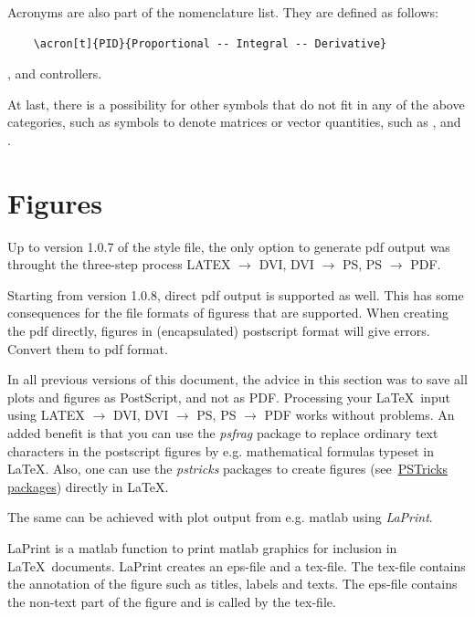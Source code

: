             Acronyms are also part of the nomenclature list. They are defined as follows:
            \begin{verbatim}
    \acron[t]{PID}{Proportional -- Integral -- Derivative}
            \end{verbatim}
            , 
             and
             controllers.
            
            At last, there is a possibility for other symbols that do not fit in any of the above categories, such as symbols to denote matrices or vector quantities, such as ,  and .
    \section{Figures}
        Up to version 1.0.7 of the style file, the only option to generate pdf output was throught the three-step process LATEX $\rightarrow$ DVI, DVI $\rightarrow$ PS, PS $\rightarrow$ PDF.
        
        Starting from version 1.0.8, direct pdf output is supported as well. This has some consequences for the file formats of figuress that are supported. When creating the pdf directly, figures in (encapsulated) postscript format will give errors. Convert them to pdf format.
        
        In all previous versions of this document, the advice in this section was to save all plots and figures as PostScript, and not as PDF. Processing your \LaTeX~input using LATEX $\rightarrow$ DVI, DVI $\rightarrow$ PS, PS $\rightarrow$ PDF works without problems. An added benefit is that you can use the \emph{psfrag} package to replace ordinary text characters in the postscript figures by e.g. mathematical formulas typeset in \LaTeX. Also, one can use the \emph{pstricks} packages to create figures (see~\href{http://www.tug.org/PSTricks/main.cgi/}{PSTricks packages}) directly in \LaTeX.
        
        The same can be achieved with plot output from e.g. {\sc matlab} using \emph{LaPrint}.
        
        LaPrint is a {\sc matlab} function to print {\sc matlab} graphics for inclusion in \LaTeX~documents. LaPrint creates an eps-file and a tex-file. The tex-file contains the annotation of the figure such as titles, labels and texts. The eps-file contains the non-text part of the figure and is called by the tex-file. 
        
